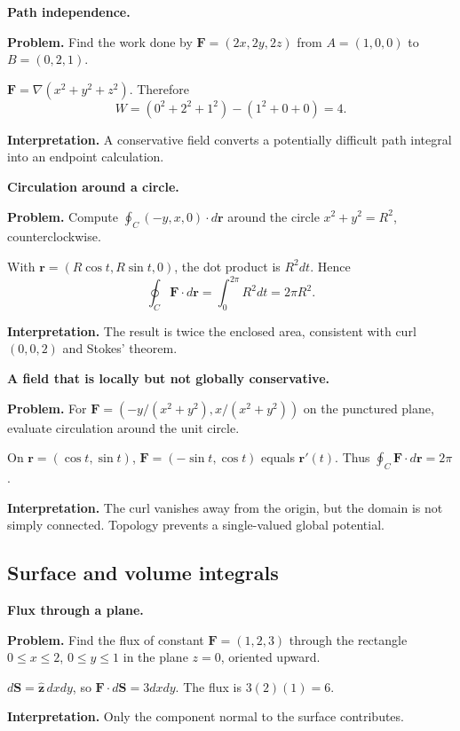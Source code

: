 \begin{workedexample}
\textbf{Path independence.}\par
\textbf{Problem.} Find the work done by $\mathbf F=(2x,2y,2z)$ from $A=(1,0,0)$ to $B=(0,2,1)$.
\begin{solution}
$\mathbf F=\nabla(x^2+y^2+z^2)$. Therefore
\[
W=(0^2+2^2+1^2)-(1^2+0+0)=4.
\]

\textbf{Interpretation.} A conservative field converts a potentially difficult path integral into an endpoint calculation.
\end{solution}
\end{workedexample}

\begin{workedexample}
\textbf{Circulation around a circle.}\par
\textbf{Problem.} Compute $\oint_C(-y,x,0)\cdot d\mathbf r$ around the circle $x^2+y^2=R^2$, counterclockwise.
\begin{solution}
With $\mathbf r=(R\cos t,R\sin t,0)$, the dot product is $R^2dt$. Hence
\[
\oint_C\mathbf F\cdot d\mathbf r=\int_0^{2\pi}R^2dt=2\pi R^2.
\]

\textbf{Interpretation.} The result is twice the enclosed area, consistent with curl $(0,0,2)$ and Stokes' theorem.
\end{solution}
\end{workedexample}

\begin{workedexample}
\textbf{A field that is locally but not globally conservative.}\par
\textbf{Problem.} For $\mathbf F=(-y/(x^2+y^2),x/(x^2+y^2))$ on the punctured plane, evaluate circulation around the unit circle.
\begin{solution}
On $\mathbf r=(\cos t,\sin t)$, $\mathbf F=(-\sin t,\cos t)$ equals $\mathbf r'(t)$. Thus $\oint_C\mathbf F\cdot d\mathbf r=2\pi$.

\textbf{Interpretation.} The curl vanishes away from the origin, but the domain is not simply connected. Topology prevents a single-valued global potential.
\end{solution}
\end{workedexample}

\subsection{Surface and volume integrals}

\begin{workedexample}
\textbf{Flux through a plane.}\par
\textbf{Problem.} Find the flux of constant $\mathbf F=(1,2,3)$ through the rectangle $0\le x\le2$, $0\le y\le1$ in the plane $z=0$, oriented upward.
\begin{solution}
$d\mathbf S=\hat{\mathbf z}\,dxdy$, so $\mathbf F\cdot d\mathbf S=3dxdy$. The flux is $3(2)(1)=6$.

\textbf{Interpretation.} Only the component normal to the surface contributes.
\end{solution}
\end{workedexample}

